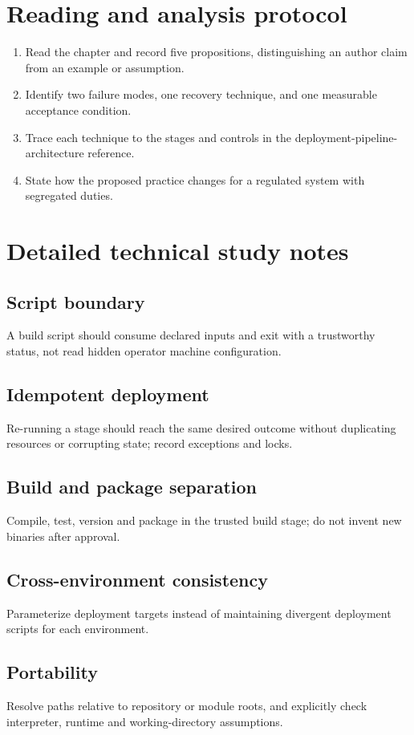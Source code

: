 \documentclass[10pt,letterpaper]{article}
\begin{document}
\section{Reading and analysis protocol}
\begin{enumerate}
\item Read the chapter and record five propositions, distinguishing an author claim from an example or assumption.
\item Identify two failure modes, one recovery technique, and one measurable acceptance condition.
\item Trace each technique to the stages and controls in the deployment-pipeline-architecture reference.
\item State how the proposed practice changes for a regulated system with segregated duties.
\end{enumerate}

\section{Detailed technical study notes}
\subsection{Script boundary}
A build script should consume declared inputs and exit with a trustworthy status, not read hidden operator machine configuration.

\subsection{Idempotent deployment}
Re-running a stage should reach the same desired outcome without duplicating resources or corrupting state; record exceptions and locks.

\subsection{Build and package separation}
Compile, test, version and package in the trusted build stage; do not invent new binaries after approval.

\subsection{Cross-environment consistency}
Parameterize deployment targets instead of maintaining divergent deployment scripts for each environment.

\subsection{Portability}
Resolve paths relative to repository or module roots, and explicitly check interpreter, runtime and working-directory assumptions.
\end{document}

